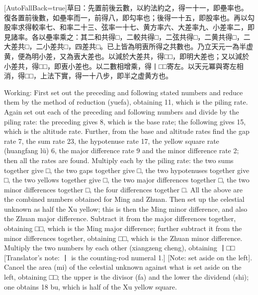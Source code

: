 \documentclass[11pt]{article}
\newcommand{\zhsmall}{\footnotesize\color{black!70}}
\newcommand{\unitlabel}[1]{\marginpar{\raggedleft\tiny\color{gray}#1}}
\newenvironment{unitzh}{\par\CJKfontspec{Noto Serif CJK SC}[AutoFallBack=true]\large\linespread{1.25}\selectfont}{\par}
\newenvironment{uniten}{\par\small\color{black!85}}{\par\medskip}
\begin{document}
\begin{unitzh}\unitlabel{ceyuan-025.10}草曰：先置前後云數，以約法約之，得一十一，即壘率也。復各置前後數，如壘率而一，前得八，即勾率也；後得一十五，即股率也。再以勾股率求得較率七、和率二十三、弦率一十七、黄方率六、大差率九、小差率二，即見諸率。各以壘率乘之：其二和共得□，二較共得□，二弦共得□，二黄共得□，二大差共□，二小差共□，四差共□。已上皆為明叀所得之共數也。乃立天元一為半虚黄，便為明小差，又為叀大差也。以減於大差共，得□□，即明大差也；又以減於小差共，得□□，即叀小差也。以二數相增乘，得丨□□{\zhsmall 寄左}。以天元冪與寄左相消，得□□，上法下實，得一十八步，即半之虚黄方也。\end{unitzh}
\begin{uniten}Working: First set out the preceding and following stated numbers and reduce them by the method of reduction (yuefa), obtaining 11, which is the piling rate. Again set out each of the preceding and following numbers and divide by the piling rate: the preceding gives 8, which is the base rate; the following gives 15, which is the altitude rate. Further, from the base and altitude rates find the gap rate 7, the sum rate 23, the hypotenuse rate 17, the yellow square rate (huangfang lü) 6, the major difference rate 9 and the minor difference rate 2; then all the rates are found. Multiply each by the piling rate: the two sums together give □, the two gaps together give □, the two hypotenuses together give □, the two yellows together give □, the two major differences together □, the two minor differences together □, the four differences together □. All the above are the combined numbers obtained for Ming and Zhuan. Then set up the celestial unknown as half the Xu yellow; this is then the Ming minor difference, and also the Zhuan major difference. Subtract it from the major differences together, obtaining □□, which is the Ming major difference; further subtract it from the minor differences together, obtaining □□, which is the Zhuan minor difference. Multiply the two numbers by each other (xiangzeng cheng), obtaining 丨□□ [Translator's note: 丨 is the counting-rod numeral 1.] [Note: set aside on the left]. Cancel the area (mi) of the celestial unknown against what is set aside on the left, obtaining □□; the upper is the divisor (fa) and the lower the dividend (shi); one obtains 18 bu, which is half of the Xu yellow square.\end{uniten}
\end{document}
